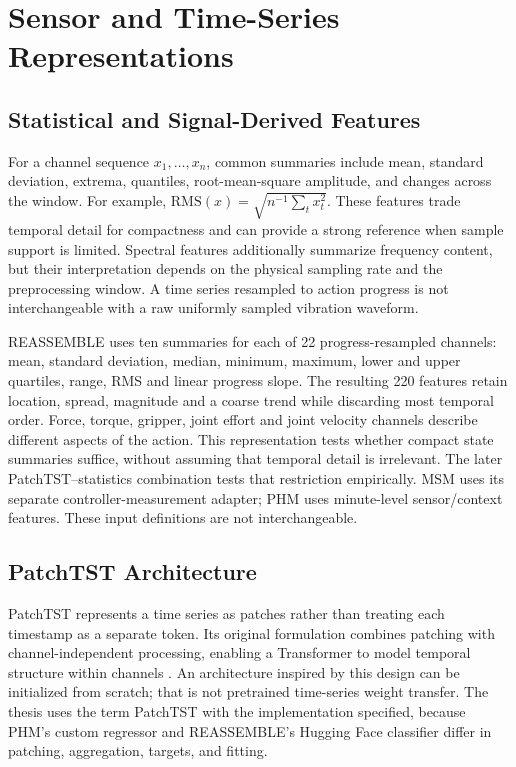 \section{Sensor and Time-Series Representations}
\subsection{Statistical and Signal-Derived Features}
For a channel sequence $x_1,\ldots,x_n$, common summaries include mean, standard deviation, extrema, quantiles, root-mean-square amplitude, and changes across the window. For example, $\mathrm{RMS}(x)=\sqrt{n^{-1}\sum_t x_t^2}$. These features trade temporal detail for compactness and can provide a strong reference when sample support is limited. Spectral features additionally summarize frequency content, but their interpretation depends on the physical sampling rate and the preprocessing window. A time series resampled to action progress is not interchangeable with a raw uniformly sampled vibration waveform.

REASSEMBLE uses ten summaries for each of 22 progress-resampled channels: mean, standard deviation, median, minimum, maximum, lower and upper quartiles, range, RMS and linear progress slope. The resulting 220 features retain location, spread, magnitude and a coarse trend while discarding most temporal order. Force, torque, gripper, joint effort and joint velocity channels describe different aspects of the action. This representation tests whether compact state summaries suffice, without assuming that temporal detail is irrelevant. The later PatchTST--statistics combination tests that restriction empirically. MSM uses its separate controller-measurement adapter; PHM uses minute-level sensor/context features. These input definitions are not interchangeable.

\subsection{PatchTST Architecture}
PatchTST represents a time series as patches rather than treating each timestamp as a separate token. Its original formulation combines patching with channel-independent processing, enabling a Transformer to model temporal structure within channels \citep{Nie2023PatchTST}. An architecture inspired by this design can be initialized from scratch; that is not pretrained time-series weight transfer. The thesis uses the term PatchTST with the implementation specified, because PHM's custom regressor and REASSEMBLE's Hugging Face classifier differ in patching, aggregation, targets, and fitting.

